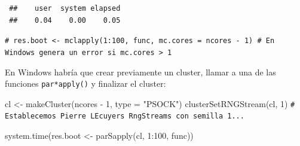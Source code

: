 \documentclass[
  10pt,
]{book}
\newenvironment{Shaded}{\begin{snugshade}}{\end{snugshade}}
\newcommand{\AttributeTok}[1]{\textcolor[rgb]{0.77,0.63,0.00}{#1}}
\newcommand{\CommentTok}[1]{\textcolor[rgb]{0.56,0.35,0.01}{\textit{#1}}}
\newcommand{\ConstantTok}[1]{\textcolor[rgb]{0.00,0.00,0.00}{#1}}
\newcommand{\ControlFlowTok}[1]{\textcolor[rgb]{0.13,0.29,0.53}{\textbf{#1}}}
\newcommand{\DecValTok}[1]{\textcolor[rgb]{0.00,0.00,0.81}{#1}}
\newcommand{\FunctionTok}[1]{\textcolor[rgb]{0.00,0.00,0.00}{#1}}
\newcommand{\NormalTok}[1]{#1}
\newcommand{\OtherTok}[1]{\textcolor[rgb]{0.56,0.35,0.01}{#1}}
\newcommand{\SpecialCharTok}[1]{\textcolor[rgb]{0.00,0.00,0.00}{#1}}
\newcommand{\StringTok}[1]{\textcolor[rgb]{0.31,0.60,0.02}{#1}}
\theoremstyle{break}
\theoremstyle{nonumberplain}
\renewcommand{\CommentTok}[1]{\textcolor[rgb]{0.41,0.41,0.41}{\texttt{#1}}}
\begin{document}
\begin{Shaded}
\end{Shaded}

\begin{verbatim}
 ##    user  system elapsed 
 ##    0.04    0.00    0.05
\end{verbatim}

\begin{Shaded}
\begin{Highlighting}[]
\CommentTok{\# res.boot \textless{}{-} mclapply(1:100, func, mc.cores = ncores {-} 1) \# En Windows genera un error si mc.cores \textgreater{} 1}
\end{Highlighting}
\end{Shaded}

En Windows habría que crear previamente un cluster, llamar a una de las funciones \texttt{par*apply()} y finalizar el cluster:

\begin{Shaded}
\begin{Highlighting}[]
\NormalTok{cl }\OtherTok{\textless{}{-}} \FunctionTok{makeCluster}\NormalTok{(ncores }\SpecialCharTok{{-}} \DecValTok{1}\NormalTok{, }\AttributeTok{type =} \StringTok{"PSOCK"}\NormalTok{)}
\FunctionTok{clusterSetRNGStream}\NormalTok{(cl, }\DecValTok{1}\NormalTok{) }\CommentTok{\# Establecemos Pierre L\textquotesingle{}Ecuyer\textquotesingle{}s RngStreams con semilla 1...}

\FunctionTok{system.time}\NormalTok{(res.boot }\OtherTok{\textless{}{-}} \FunctionTok{parSapply}\NormalTok{(cl, }\DecValTok{1}\SpecialCharTok{:}\DecValTok{100}\NormalTok{, func))}
\end{Highlighting}
\end{Shaded}
\end{document}
